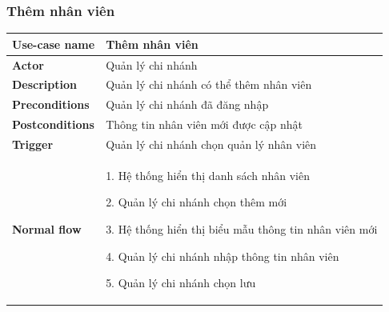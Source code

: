         \subsubsection{Thêm nhân viên}
            \begin{longtable}{| p{} | p{} |} 
                \hline
                    \textbf{Use-case name} 
                & 
                    Thêm nhân viên
                \\
                \hline
                    \textbf{Actor} 
                & 
                    Quản lý chi nhánh
                \\
                \hline
                    \textbf{Description} 
                & 
                    Quản lý chi nhánh có thể thêm nhân viên
                \\
                \hline
                    \textbf{Preconditions} 
                &
                    Quản lý chi nhánh đã đăng nhập
                \\
                \hline
                    \textbf{Postconditions} 
                & 
                    Thông tin nhân viên mới được cập nhật
                \\
                \hline
                    \textbf{Trigger} 
                & 
                    Quản lý chi nhánh chọn quản lý nhân viên
                \\
                \hline
                \begin{flushleft}
                    \textbf{Normal flow}
                \end{flushleft}
                & 
                1. Hệ thống hiển thị danh sách nhân viên
                    
                    2. Quản lý chi nhánh chọn thêm mới
                    
                    3. Hệ thống hiển thị biểu mẫu thông tin  nhân viên mới
                    
                    4. Quản lý chi nhánh nhập thông tin nhân viên
                    
                    5. Quản lý chi nhánh chọn lưu
                    

\end{longtable}
